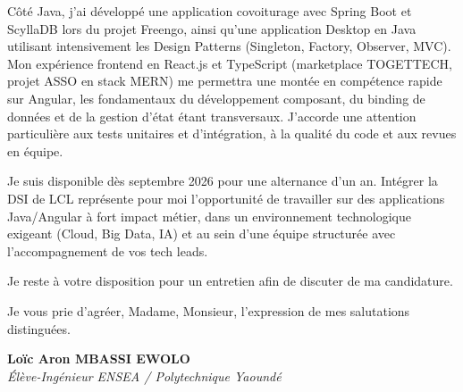\documentclass[a4paper,11pt]{article}
\begin{document}
Côté Java, j'ai développé une application covoiturage avec Spring Boot et ScyllaDB lors du projet Freengo, ainsi qu'une application Desktop en Java utilisant intensivement les Design Patterns (Singleton, Factory, Observer, MVC). Mon expérience frontend en React.js et TypeScript (marketplace TOGETTECH, projet ASSO en stack MERN) me permettra une montée en compétence rapide sur Angular, les fondamentaux du développement composant, du binding de données et de la gestion d'état étant transversaux. J'accorde une attention particulière aux tests unitaires et d'intégration, à la qualité du code et aux revues en équipe.

Je suis disponible dès septembre 2026 pour une alternance d'un an. Intégrer la DSI de LCL représente pour moi l'opportunité de travailler sur des applications Java/Angular à fort impact métier, dans un environnement technologique exigeant (Cloud, Big Data, IA) et au sein d'une équipe structurée avec l'accompagnement de vos tech leads.

Je reste à votre disposition pour un entretien afin de discuter de ma candidature.

Je vous prie d'agréer, Madame, Monsieur, l'expression de mes salutations distinguées.

\vspace{0.8cm}

\textbf{Loïc Aron MBASSI EWOLO}\\
\textit{Élève-Ingénieur ENSEA / Polytechnique Yaoundé}
\end{document}
